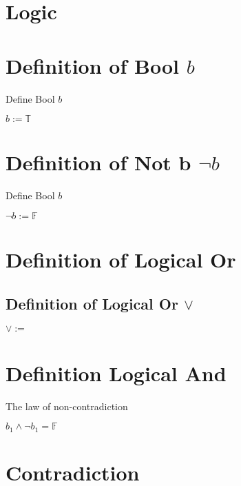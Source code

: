 \documentclass[11pt]{article}
\begin{document}
\section*{Logic}



\section{Definition of Bool $b$}
Define Bool $b$
\begin{center}
\vspace{1mm}
$
b := \mathbb{T}
$
\end{center}

\section{Definition of Not b $\lnot b$}
Define Bool $b$
\begin{center}
\vspace{1mm}
$
\lnot b := \mathbb{F}
$
\end{center}


\section{Definition of Logical Or}
\subsection{Definition of Logical Or $\lor$}
\vspace{3mm}
\begin{center}
\vspace{1mm}
$
\lor :=
$
\end{center}






\section{Definition Logical And}
The law of non-contradiction
\begin{center}
$
b_1 \land \lnot b_1 = \mathbb{F}
$
\end{center}



\section{Contradiction}
\end{document}
